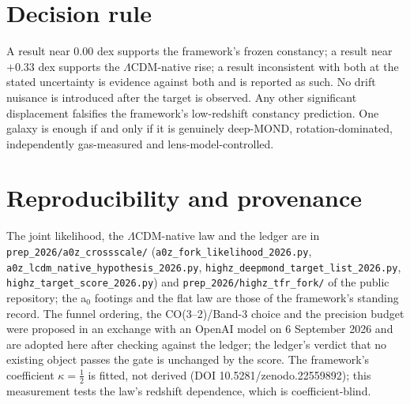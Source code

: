 \documentclass[11pt,letterpaper]{article}
\begin{document}
\section{Decision rule}
A result near $0.00$ dex supports the framework's frozen constancy; a result near $+0.33$ dex supports the $\Lambda$CDM-native rise; a result inconsistent with both at the stated uncertainty is evidence against both and is reported as such. No drift nuisance is introduced after the target is observed. Any other significant displacement falsifies the framework's low-redshift constancy prediction. One galaxy is enough if and only if it is genuinely deep-MOND, rotation-dominated, independently gas-measured and lens-model-controlled.

\section*{Reproducibility and provenance}
\sloppy The joint likelihood, the $\Lambda$CDM-native law and the ledger are in \texttt{prep\_2026/a0z\_crossscale/} (\texttt{a0z\_fork\_likelihood\_2026.py}, \texttt{a0z\_lcdm\_native\_hypothesis\_2026.py}, \texttt{highz\_deepmond\_target\_list\_2026.py}, \texttt{highz\_target\_score\_2026.py}) and \texttt{prep\_2026/highz\_tfr\_fork/} of the public repository; the a$_0$ footings and the flat law are those of the framework's standing record. The funnel ordering, the CO(3--2)/Band-3 choice and the precision budget were proposed in an exchange with an OpenAI model on 6 September 2026 and are adopted here after checking against the ledger; the ledger's verdict that no existing object passes the gate is unchanged by the score. The framework's coefficient $\kappa=\tfrac12$ is fitted, not derived (DOI 10.5281/zenodo.22559892); this measurement tests the law's redshift dependence, which is coefficient-blind.
\end{document}

